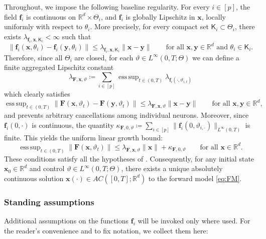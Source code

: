 \documentclass[twoside,11pt]{article}
\theoremstyle{plain}
\def\R{\mathbb R}
\DeclareMathOperator*{\esssup}{ess\,sup}
\newcommand{\bff}{\mathbf{f}}
\newcommand{\bfF}{\mathbf{F}}
\newcommand{\bfx}{\mathbf{x}}
\newcommand{\bfy}{\mathbf{y}}
\begin{document}
Throughout, we impose the following baseline regularity. For every $i\in[p]$, the field $\bff_i$ is continuous on $\R^d\times\Theta_i$, and $\bff_i$ is globally Lipschitz in $\bfx$, locally uniformly with respect to $\theta_i$. More precisely, for every compact set $\mathsf K_i\subset\Theta_i$, there exists $\lambda_{\bff_i,\bfx,\mathsf K_i}<\infty$ such that
\begin{equation}\label{ass:baseline_lipx}
\|\bff_i(\bfx,\theta_i)-\bff_i(\bfy,\theta_i)\| \le \lambda_{\bff_i,\bfx,\mathsf K_i}\|\bfx-\bfy\|\qquad \text{for all } \bfx,\bfy\in\R^d\text{ and }\theta_i\in\mathsf K_i.
\end{equation}
Therefore, since all $\Theta_i$ are closed, for each $\vartheta\in L^\infty(0,T;\Theta)$ we can define a finite aggregated Lipschitz constant
\begin{equation}\label{eq:condlipf_aggregated}
\lambda_{\bfF,\bfx,\vartheta} \coloneqq \sum_{i\in[p]} \esssup_{t\in(0,T)} \lambda_{\bff_i(\cdot,\vartheta_{i,t})}
\end{equation}
which clearly satisfies
\begin{equation}\label{eq:condlipf}
    \esssup_{t\in(0,T)}\|\bfF(\bfx,\vartheta_t)-\bfF(\bfy,\vartheta_t)\| \leq \lambda_{\bfF,\bfx,\vartheta}\|\bfx-\bfy\| \qquad \text{for all } \bfx,\bfy\in\R^d,
\end{equation}
and prevents arbitrary cancellations among individual neurons. Moreover, since $\bff_i(0,\cdot)$ is continuous, the quantity $\kappa_{\bfF,0,\vartheta}\coloneqq \sum_{i\in[p]}\|\bff_i(0,\vartheta_{i,\cdot})\|_{L^\infty(0,T)}$ is finite. This yields the uniform linear growth bound:
\begin{equation}\label{eq:condgrowthf}
    \esssup_{t\in(0,T)}\|\bfF(\bfx,\vartheta_t)\| \leq \lambda_{\bfF,\bfx,\vartheta}\|\bfx\| + \kappa_{\bfF,0,\vartheta} \qquad \text{for all } \bfx\in\R^d.
\end{equation}
These conditions satisfy all the hypotheses of . Consequently, for any initial state $\bfx_0\in\R^d$ and control $\vartheta\in L^\infty(0,T;\Theta)$, there exists a unique absolutely continuous solution $\bfx(\cdot)\in {AC}([0,T];\R^d)$ to the forward model \eqref{eq:FM}.



\subsubsection*{Standing assumptions}
Additional assumptions on the functions $\bff_i$ will be invoked only where used. For the reader's convenience and to fix notation, we collect them here:
\end{document}
